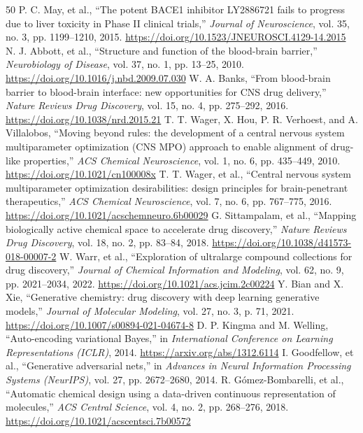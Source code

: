 \documentclass[10pt,a4paper]{article}
\begin{document}
\begin{thebibliography}{50}
 P. C. May, et al., ``The potent BACE1 inhibitor LY2886721 fails to progress due to liver toxicity in Phase II clinical trials,'' \textit{Journal of Neuroscience}, vol. 35, no. 3, pp. 1199--1210, 2015. \url{https://doi.org/10.1523/JNEUROSCI.4129-14.2015}
 N. J. Abbott, et al., ``Structure and function of the blood-brain barrier,'' \textit{Neurobiology of Disease}, vol. 37, no. 1, pp. 13--25, 2010. \url{https://doi.org/10.1016/j.nbd.2009.07.030}
 W. A. Banks, ``From blood-brain barrier to blood-brain interface: new opportunities for CNS drug delivery,'' \textit{Nature Reviews Drug Discovery}, vol. 15, no. 4, pp. 275--292, 2016. \url{https://doi.org/10.1038/nrd.2015.21}
 T. T. Wager, X. Hou, P. R. Verhoest, and A. Villalobos, ``Moving beyond rules: the development of a central nervous system multiparameter optimization (CNS MPO) approach to enable alignment of drug-like properties,'' \textit{ACS Chemical Neuroscience}, vol. 1, no. 6, pp. 435--449, 2010. \url{https://doi.org/10.1021/cn100008x}
 T. T. Wager, et al., ``Central nervous system multiparameter optimization desirabilities: design principles for brain-penetrant therapeutics,'' \textit{ACS Chemical Neuroscience}, vol. 7, no. 6, pp. 767--775, 2016. \url{https://doi.org/10.1021/acschemneuro.6b00029}
 G. Sittampalam, et al., ``Mapping biologically active chemical space to accelerate drug discovery,'' \textit{Nature Reviews Drug Discovery}, vol. 18, no. 2, pp. 83--84, 2018. \url{https://doi.org/10.1038/d41573-018-00007-2}
 W. Warr, et al., ``Exploration of ultralarge compound collections for drug discovery,'' \textit{Journal of Chemical Information and Modeling}, vol. 62, no. 9, pp. 2021--2034, 2022. \url{https://doi.org/10.1021/acs.jcim.2c00224}
 Y. Bian and X. Xie, ``Generative chemistry: drug discovery with deep learning generative models,'' \textit{Journal of Molecular Modeling}, vol. 27, no. 3, p. 71, 2021. \url{https://doi.org/10.1007/s00894-021-04674-8}
 D. P. Kingma and M. Welling, ``Auto-encoding variational Bayes,'' in \textit{International Conference on Learning Representations (ICLR)}, 2014. \url{https://arxiv.org/abs/1312.6114}
 I. Goodfellow, et al., ``Generative adversarial nets,'' in \textit{Advances in Neural Information Processing Systems (NeurIPS)}, vol. 27, pp. 2672--2680, 2014.
 R. Gómez-Bombarelli, et al., ``Automatic chemical design using a data-driven continuous representation of molecules,'' \textit{ACS Central Science}, vol. 4, no. 2, pp. 268--276, 2018. \url{https://doi.org/10.1021/acscentsci.7b00572}

\end{thebibliography}
\end{document}
